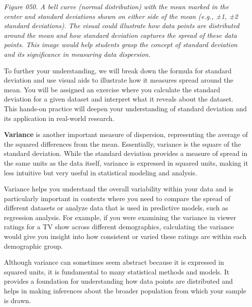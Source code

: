 \documentclass[
]{book}
\begin{document}
\emph{Figure 050. A bell curve (normal distribution) with the mean marked in the center and standard deviations shown on either side of the mean (e.g., ±1, ±2 standard deviations). The visual could illustrate how data points are distributed around the mean and how standard deviation captures the spread of these data points. This image would help students grasp the concept of standard deviation and its significance in measuring data dispersion.}

To further your understanding, we will break down the formula for standard deviation and use visual aids to illustrate how it measures spread around the mean. You will be assigned an exercise where you calculate the standard deviation for a given dataset and interpret what it reveals about the dataset. This hands-on practice will deepen your understanding of standard deviation and its application in real-world research.

\textbf{Variance} is another important measure of dispersion, representing the average of the squared differences from the mean. Essentially, variance is the square of the standard deviation. While the standard deviation provides a measure of spread in the same units as the data itself, variance is expressed in squared units, making it less intuitive but very useful in statistical modeling and analysis.

Variance helps you understand the overall variability within your data and is particularly important in contexts where you need to compare the spread of different datasets or analyze data that is used in predictive models, such as regression analysis. For example, if you were examining the variance in viewer ratings for a TV show across different demographics, calculating the variance would give you insight into how consistent or varied these ratings are within each demographic group.

Although variance can sometimes seem abstract because it is expressed in squared units, it is fundamental to many statistical methods and models. It provides a foundation for understanding how data points are distributed and helps in making inferences about the broader population from which your sample is drawn.
\end{document}
